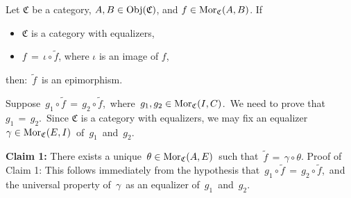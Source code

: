 \vskip 0.5cm
\begin{lemma}\label{fTildeIsEpimorphism}
\mbox{}
\vskip 0.1cm
\noindent
Let $\mathfrak{C}$ be a category, $A, B \in \textnormal{Obj}(\mathfrak{C})$, and $f \in \textnormal{Mor}_{\mathfrak{C}}(A,B)$.
\vskip 0.1cm
\noindent
If
\begin{itemize}
\item
	$\mathfrak{C}$ is a category with equalizers,
\item
	$f \,=\, \iota \circ \widetilde{f}$, where $\iota$ is an image of $f$,
\end{itemize}
then: \,$\widetilde{f}$\, is an epimorphism.
\end{lemma}
\proof
Suppose \,$g_{1} \circ \widetilde{f} \,=\, g_{2} \circ \widetilde{f}$,\,
where \,$g_{1}, g_{2} \in \textnormal{Mor}_{\mathfrak{C}}(I,C)$.\,
We need to prove that \,$g_{1} \,=\, g_{2}$.\,
\vskip 0.3cm
\noindent
Since $\mathfrak{C}$ is a category with equalizers,
we may fix an equalizer \,$\gamma \in \textnormal{Mor}_{\mathfrak{C}}(E,I)$\, of \,$g_{1}$\, and \,$g_{2}$.
\begin{center}
\end{center}

\vskip 0.3cm
\noindent
\textbf{Claim 1:}\;\; There exists a unique \,$\theta \in \textnormal{Mor}_{\mathfrak{C}}(A,E)$\, such that \,$\widetilde{f} \,=\, \gamma \circ \theta$.
\vskip 0.1cm
\noindent
Proof of Claim 1:\; This follows immediately from the hypothesis that
\,$g_{1} \circ \widetilde{f} \,=\, g_{2} \circ \widetilde{f}$,\,
and the universal property of \,$\gamma$\, as an equalizer of \,$g_{1}$\, and \,$g_{2}$.


